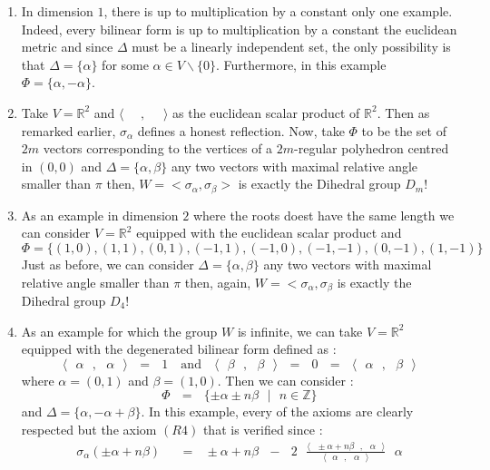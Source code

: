 \documentclass[envcountsame,envcountchap]{svmono}
\newcommand{\Z}{\mathbb Z}
\newcommand{\R}{\mathbb R}
\newcommand{\prods}[2]{\langle\qq #1\qq,\qq#2\qq\rangle}
\newcommand{\q}{\quad}
\newcommand{\qq}{\text{ }}
\begin{document}
\begin{enumerate}
	\item In dimension $1$, there is up to multiplication by a constant only one example. Indeed, every bilinear form is up to multiplication by a constant the euclidean metric and since $\Delta$ must be a linearly independent set, the only possibility is that $\Delta=\{\alpha\}$ for some $\alpha\in V\backslash\{0\}$. Furthermore, in this example $\Phi=\{\alpha,-\alpha\}$.
	\item Take $V=\R^2$ and $\prods{}{}$ as the euclidean scalar product of $\R^2$. Then as remarked earlier, $\sigma_\alpha$ defines a honest reflection. Now, take $\Phi$ to be the set of $2m$ vectors corresponding to the vertices of a $2m$-regular polyhedron centred in $(0,0)$ and $\Delta=\{\alpha,\beta\}$ any two vectors with maximal relative angle smaller than $\pi$ then, $W=<\sigma_\alpha,\sigma_\beta>$ is exactly the Dihedral group $D_m$!
	\item As an example in dimension $2$ where the roots doest have the same length we can consider $V=\R^2$ equipped with the euclidean scalar product and
	\begin{equation}
	\Phi=\{(1,0),(1,1),(0,1),(-1,1),(-1,0),(-1,-1),(0,-1),(1,-1)\}
	\end{equation}
	Just as before, we can consider $\Delta=\{\alpha,\beta\}$ any two vectors with maximal relative angle smaller than $\pi$ then, again, $W=<\sigma_\alpha,\sigma_\beta$ is exactly the Dihedral group $D_4$!
	\item As an example for which the group $W$ is infinite, we can take $V=\R^2$ equipped with the degenerated bilinear form defined as :
	\begin{equation}
	\prods{\alpha}{\alpha}\qq=\qq 1\q\mbox{and}\q \prods{\beta}{\beta}\qq=\qq 0\qq=\qq\prods{\alpha}{\beta}
	\end{equation}
	where $\alpha=(0,1)$ and $\beta=(1,0)$. Then we can consider :
	\begin{equation}
	\Phi\qq=\qq \{\pm \alpha\pm n\beta\qq\lvert\qq n\in \Z \}
	\end{equation}
	and $\Delta=\{\alpha,-\alpha+\beta\}$. In this example, every of the axioms are clearly respected but the axiom $(R4)$ that is verified since :
	\begin{equation}
	\begin{split}
	\sigma_\alpha(\pm\alpha +n\beta)\qq&=\qq \pm\alpha +n\beta\qq -\qq 2\qq \frac{\prods{\pm\alpha +n\beta}{\alpha}}{\prods{\alpha}{\alpha}}\qq\alpha \\

\end{split}
\end{equation}
\end{enumerate}
\end{document}
